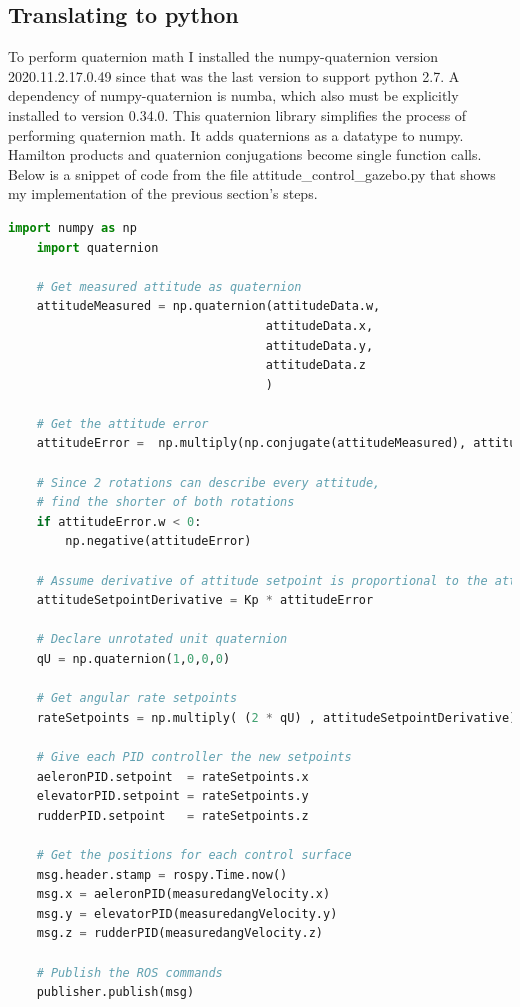 \documentclass[11pt]{scrartcl} %
\begin{document}
\subsection{Translating to python}
To perform quaternion math I installed the numpy-quaternion version 2020.11.2.17.0.49 since that was the last version to support python 2.7. 
A dependency of numpy-quaternion is numba, which also must be explicitly installed to version 0.34.0.
This quaternion library simplifies the process of performing quaternion math. It adds quaternions as a datatype to numpy. Hamilton products and quaternion conjugations become single function calls.
Below is a snippet of code from the file attitude\_control\_gazebo.py that shows my implementation of the previous section's steps.

\begin{lstlisting}[language=Python] 
    import numpy as np
    import quaternion

    # Get measured attitude as quaternion
    attitudeMeasured = np.quaternion(attitudeData.w,
                                    attitudeData.x,
                                    attitudeData.y,
                                    attitudeData.z
                                    ) 

    # Get the attitude error 
    attitudeError =  np.multiply(np.conjugate(attitudeMeasured), attitudeSetpoint)

    # Since 2 rotations can describe every attitude,
    # find the shorter of both rotations 
    if attitudeError.w < 0:
        np.negative(attitudeError)

    # Assume derivative of attitude setpoint is proportional to the attitude error
    attitudeSetpointDerivative = Kp * attitudeError

    # Declare unrotated unit quaternion
    qU = np.quaternion(1,0,0,0)  

    # Get angular rate setpoints 
    rateSetpoints = np.multiply( (2 * qU) , attitudeSetpointDerivative)

    # Give each PID controller the new setpoints
    aeleronPID.setpoint  = rateSetpoints.x
    elevatorPID.setpoint = rateSetpoints.y
    rudderPID.setpoint   = rateSetpoints.z

    # Get the positions for each control surface
    msg.header.stamp = rospy.Time.now()
    msg.x = aeleronPID(measuredangVelocity.x)
    msg.y = elevatorPID(measuredangVelocity.y) 
    msg.z = rudderPID(measuredangVelocity.z)

    # Publish the ROS commands
    publisher.publish(msg)
\end{lstlisting}
\end{document}
